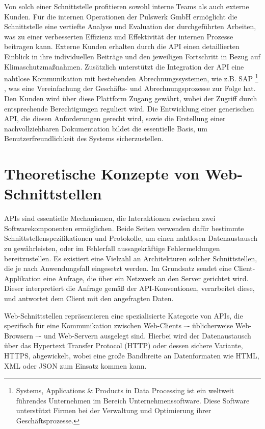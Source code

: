 \documentclass[draft,final]{vutinfth} %
\begin{document}
Von solch einer Schnittstelle profitieren sowohl interne Teams als auch externe Kunden. 
Für die internen Operationen der Pulswerk GmbH ermöglicht die Schnittstelle eine vertiefte Analyse und Evaluation der durchgeführten Arbeiten, was zu einer verbesserten Effizienz und Effektivität der internen Prozesse beitragen kann. 
Externe Kunden erhalten durch die API einen detaillierten Einblick in ihre individuellen Beiträge und den jeweiligen Fortschritt in Bezug auf Klimaschutzmaßnahmen. 
Zusätzlich unterstützt die Integration der API eine nahtlose Kommunikation mit bestehenden Abrechnungssystemen, wie z.B. SAP
\footnote{
	Systems, Applications \& Products in Data Processing ist ein weltweit führendes Unternehmen im Bereich Unternehmenssoftware. 
	Diese Software unterstützt Firmen bei der Verwaltung und Optimierung ihrer Geschäftsprozesse.
}
, was eine Vereinfachung der Geschäfts- und Abrechnungsprozesse zur Folge hat.
Den Kunden wird über diese Plattform Zugang gewährt, wobei der Zugriff durch entsprechende Berechtigungen reguliert wird. 
Die Entwicklung einer generischen API, die diesen Anforderungen gerecht wird, sowie die Erstellung einer nachvollziehbaren Dokumentation bildet die essentielle Basis, um Benutzerfreundlichkeit des Systems sicherzustellen.


\section{Theoretische Konzepte von Web-Schnittstellen}

APIs sind essentielle Mechanismen, die Interaktionen zwischen zwei Softwarekomponenten ermöglichen. 
Beide Seiten verwenden dafür bestimmte Schnittstellenspezifikationen und Protokolle, um einen nahtlosen Datenaustausch zu gewährleisten, oder im Fehlerfall aussagekräftige Fehlermeldungen bereitzustellen.
Es existiert eine Vielzahl an Architekturen solcher Schnittstellen, die je nach Anwendungsfall eingesetzt werden.
Im Grundsatz sendet eine Client-Applikation eine Anfrage, die über ein Netzwerk an den Server gerichtet wird. 
Dieser interpretiert die Anfrage gemäß der API-Konventionen, verarbeitet diese, und antwortet dem Client mit den angefragten Daten.

Web-Schnittstellen repräsentieren eine spezialisierte Kategorie von APIs, die spezifisch für eine Kommunikation zwischen Web-Clients –- üblicherweise Web-Browsern –- und Web-Servern ausgelegt sind. 
Hierbei wird der Datenaustausch über das Hypertext Transfer Protocol (HTTP) oder dessen sichere Variante, HTTPS, abgewickelt, wobei eine große Bandbreite an Datenformaten wie HTML, XML oder JSON zum Einsatz kommen kann.
\end{document}

